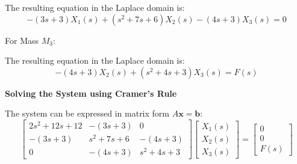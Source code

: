 ﻿\documentclass[11pt]{article}
\begin{document}
The resulting equation in the Laplace domain is:
\begin{equation}
-(3s + 3)X_1(s) + (s^2 + 7s + 6)X_2(s) - (4s + 3)X_3(s) = 0 \tag{2}
\end{equation}

\newpage

\vspace{12pt}
{For Mass $M_3$:}
\begin{figure}[h!]
\centering
{}
\end{figure}

The resulting equation in the Laplace domain is:
\begin{equation}
-(4s + 3)X_2(s) + (s^2 + 4s + 3)X_3(s) = F(s) \tag{3}
\end{equation}

\noindent\textbf{Solving the System using Cramer's Rule}
\vspace{12pt}

The system can be expressed in matrix form $A\mathbf{x} = \mathbf{b}$:
$$
\begin{bmatrix}
2s^2 + 12s + 12 & -(3s + 3) & 0 \\
-(3s + 3) & s^2 + 7s + 6 & -(4s + 3) \\
0 & -(4s + 3) & s^2 + 4s + 3
\end{bmatrix}
\begin{bmatrix}
X_1(s) \\
X_2(s) \\
X_3(s)
\end{bmatrix}
=
\begin{bmatrix}
0 \\
0 \\
F(s)
\end{bmatrix}
$$
\end{document}
